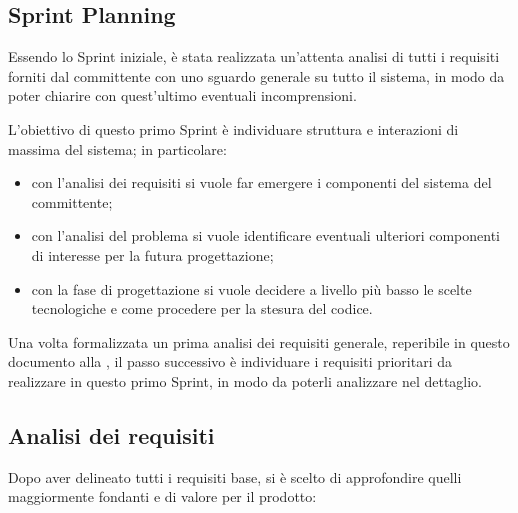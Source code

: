 
\subsection{Sprint Planning}

Essendo lo Sprint iniziale, è stata realizzata un'attenta analisi di tutti i requisiti forniti dal committente
con uno sguardo generale su tutto il sistema, in modo da poter chiarire con quest'ultimo eventuali incomprensioni.

L'obiettivo di questo primo Sprint è individuare struttura e interazioni di massima del sistema; in particolare:
\begin{itemize}
  \item
    con l'analisi dei requisiti si vuole far emergere i componenti del sistema del committente;
  \item
    con l'analisi del problema si vuole identificare eventuali ulteriori componenti di interesse per la futura progettazione;
  \item
    con la fase di progettazione si vuole decidere a livello più basso le scelte tecnologiche e come procedere per la stesura del codice.
\end{itemize}

Una volta formalizzata un prima analisi dei requisiti generale, reperibile in questo documento alla ,
il passo successivo è individuare i requisiti prioritari da realizzare in questo primo Sprint, in modo da poterli analizzare nel dettaglio.

\subsection{Analisi dei requisiti}

Dopo aver delineato tutti i requisiti base, si è scelto di approfondire quelli maggiormente fondanti e di valore per il prodotto:

